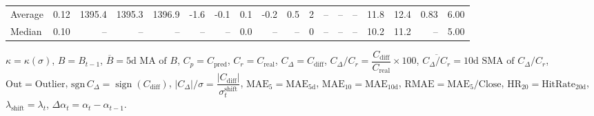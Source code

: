 \begin{threeparttable}
{\begin{tabular}{lrrrrrrrrrrrrrrrrr}
Average &     0.12 & 1395.4 & 1395.3 & 1396.9 &       -1.6 &           -0.1 &                       0.1 &                     -0.2 &                 0.5 &              2 &         -- &        -- &             -- &             11.8 &                12.4 &            0.83 &                   6.00 \\
 Median &     0.10 &     -- &     -- &     -- &         -- &             -- &                       0.0 &                       -- &                  -- &              0 &         -- &        -- &             -- &             10.2 &                11.2 &              -- &                   5.00 \\
\bottomrule
\end{tabular}
}
\begin{tablenotes}\footnotesize
\item $\kappa=\kappa(\sigma)$, $B=B_{t-1}$, $\overline{B}=\text{5d MA of }B$, $C_p=C_{\text{pred}}$, $C_r=C_{\text{real}}$, $C_\Delta=C_{\text{diff}}$, $C_\Delta/C_r=\dfrac{C_{\text{diff}}}{C_{\text{real}}}\times100$, $\overline{C_\Delta/C_r}=\text{10d SMA of }C_\Delta/C_r$, $\mathrm{Out}=\text{Outlier}$, $\mathrm{sgn}\,C_\Delta=\operatorname{sign}(C_{\text{diff}})$, $|C_\Delta|/\sigma=\dfrac{|C_{\text{diff}}|}{\sigma_t^{\text{shift}}}$, $\mathrm{MAE}_5=\mathrm{MAE}_{5\text{d}}$, $\mathrm{MAE}_{10}=\mathrm{MAE}_{10\text{d}}$, $\mathrm{RMAE}= \mathrm{MAE}_5 / \text{Close}$, $\mathrm{HR}_{20}=\mathrm{HitRate}_{20\text{d}}$, $\lambda_{\text{shift}}=\lambda_t$, $\Delta\alpha_t=\alpha_t-\alpha_{t-1}$.
\end{tablenotes}
\end{threeparttable}
\endgroup


